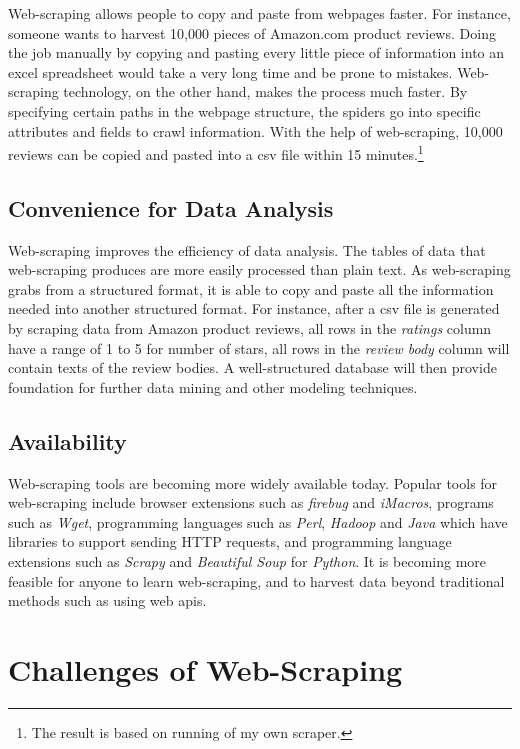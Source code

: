 \documentclass[12pt,twoside,draft]{report}
\begin{document}
Web-scraping allows people to copy and paste from webpages faster. For instance, someone wants to harvest 10,000 pieces of Amazon.com product reviews. Doing the job manually by copying and pasting every little piece of information into an excel spreadsheet would take a very long time and be prone to mistakes. Web-scraping technology, on the other hand, makes the process much faster. By specifying certain paths in the webpage structure, the spiders go into specific attributes and fields to \gls{crawl} information. With the help of web-scraping, 10,000 reviews can be copied and pasted into a \gls{csv} file within 15 minutes.\footnote{The result is based on running of my own scraper.}

\subsection{Convenience for Data Analysis}

Web-scraping improves the efficiency of data analysis. The tables of data that web-scraping produces are more easily processed than plain text. As web-scraping grabs from a structured format, it is able to copy and paste all the information needed into another structured format. For instance, after a \gls{csv} file is generated by scraping data from Amazon product reviews, all rows in the \textit{ratings} column have a range of 1 to 5 for number of stars, all rows in the \textit{review body} column will contain texts of the review bodies. A well-structured database will then provide foundation for further data \gls{mining} and other modeling techniques.

\subsection{Availability}

Web-scraping tools are becoming more widely available today. Popular tools for web-scraping include browser extensions such as \textit{firebug} and \textit{iMacros}, programs such as \textit{Wget}, programming languages such as \textit{Perl}, \textit{Hadoop} and \textit{Java} which have libraries to support sending HTTP requests, and programming language extensions such as \textit{Scrapy} and \textit{Beautiful Soup} for \textit{Python}. It is becoming more feasible for anyone to learn web-scraping, and to \gls{harvest} data beyond traditional methods such as using web \gls{api}s.

\section{Challenges of Web-Scraping}
\end{document}
